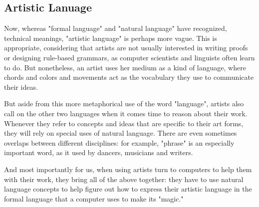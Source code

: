 \documentclass[11pt]{article}
\begin{document}
\subsection{Artistic Lanuage}
\label{sec:orgheadline14}
Now, whereas "formal language" and "natural language" have recognized,
technical meanings, "artistic language" is perhaps more vague. This is
appropriate, considering that artists are not usually interested in
writing proofs or designing rule-based grammars, as computer
scientists and linguists often learn to do. But nonetheless, an artist
uses her medium as a kind of language, where chords and colors and
movements act as the vocabulary they use to communicate their ideas.

But aside from this more metaphorical use of the word "language",
artists also call on the other two languages when it comes time to
reason about their work. Whenever they refer to concepts and ideas
that are specific to their art forms, they will rely on special uses
of natural language. There are even sometimes overlaps between
different disciplines: for example, "phrase" is an especially
important word, as it used by dancers, musicians and writers.

And most importantly for us, when using artists turn to computers to
help them with their work, they bring all of the above together: they
have to use natural language concepts to help figure out how to
express their artistic language in the formal language that a computer
uses to make its "magic."
\end{document}
